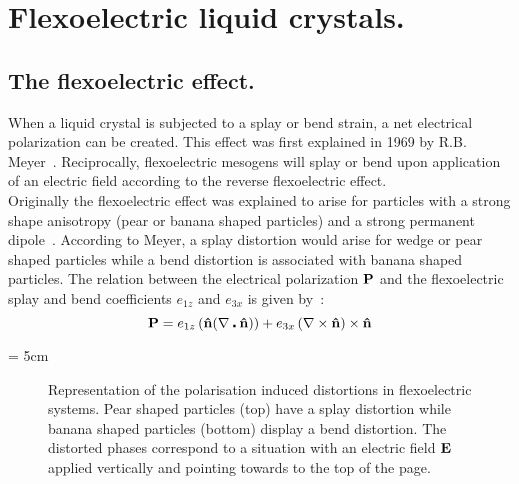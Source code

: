 

\section{Flexoelectric liquid crystals.}


\subsection{The flexoelectric effect.}


When a liquid crystal is subjected to a splay or bend strain, a net electrical polarization can
be created. This effect was first explained in 1969 by R.B. Meyer~\cite{Meyer69}. Reciprocally,
flexoelectric mesogens will splay or bend upon application of an electric field according to the
reverse flexoelectric effect.\\
Originally the flexoelectric effect was explained to arise for particles with a strong shape
anisotropy (\ie pear or banana shaped particles) and a strong permanent dipole~\cite{Meyer69}. 
According to Meyer, a splay distortion 
would arise for wedge  or pear shaped particles while a bend distortion is associated with banana shaped
particles. The relation between the electrical polarization $\mathbf{P}$ and the flexoelectric splay 
and bend coefficients $e_{1z}$ and $e_{3x}$ is given by~\cite{deGennes}:
\begin{equation}
	\mathbf{P} = e_{1z}\left( \mathbf{\hat{n} }(\nabla\centerdot\mathbf{\hat{n} }) \right) 
	+ e_{3x}\left(\nabla\times\mathbf{\hat{n} }\right)\times\mathbf{\hat{n} }
\end{equation}

\picW = 5cm
\begin{figure}
	\centering
	\hspace*{10mm}
	
	\hspace*{10mm}
	\caption[Representation of the polarisation induced distortions in flexoelectric systems.]
	{Representation of the polarisation induced distortions in flexoelectric systems. 
	Pear shaped particles (top) have a splay distortion while banana shaped particles
	(bottom) display a bend distortion. The distorted phases correspond to a situation with
	an electric field $\mathbf{E}$ applied vertically and pointing towards to the top of the page.}
\end{figure}

